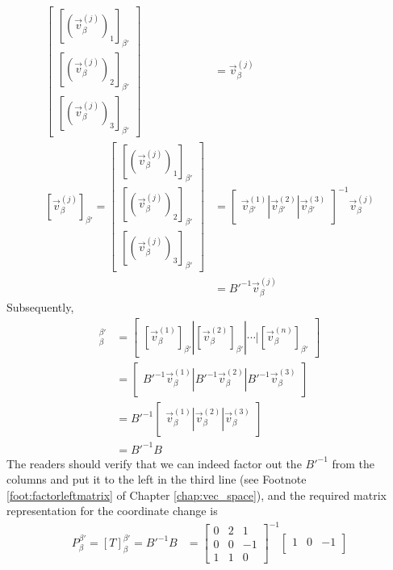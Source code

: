 \begin{solution}
\begin{align*}
\begin{bmatrix}
[(\vec{v}_{\beta}^{(j)})_1]_{\beta'} \\
[(\vec{v}_{\beta}^{(j)})_2]_{\beta'} \\
[(\vec{v}_{\beta}^{(j)})_3]_{\beta'}
\end{bmatrix}
&=
\vec{v}_{\beta}^{(j)} \\
[\vec{v}_{\beta}^{(j)}]_{\beta'} =
\begin{bmatrix}
[(\vec{v}_{\beta}^{(j)})_1]_{\beta'} \\
[(\vec{v}_{\beta}^{(j)})_2]_{\beta'} \\
[(\vec{v}_{\beta}^{(j)})_3]_{\beta'}
\end{bmatrix}
&=
\begin{bmatrix}
\vec{v}_{\beta'}^{(1)} | \vec{v}_{\beta'}^{(2)} | \vec{v}_{\beta'}^{(3)}
\end{bmatrix}^{-1}
\vec{v}_{\beta}^{(j)} \\
&= B'^{-1}\vec{v}_{\beta}^{(j)}
\end{align*} 
Subsequently,
\begin{align*}
[T]_\beta^{\beta'} &= \begin{bmatrix}
[\vec{v}_{\beta}^{(1)}]_{\beta'} | [\vec{v}_{\beta}^{(2)}]_{\beta'} | \cdots | [\vec{v}_{\beta}^{(n)}]_{\beta'}
\end{bmatrix} \\
&= \begin{bmatrix}
B'^{-1}\vec{v}_{\beta}^{(1)} | B'^{-1}\vec{v}_{\beta}^{(2)} | B'^{-1}\vec{v}_{\beta}^{(3)}
\end{bmatrix} \\
&= B'^{-1}\begin{bmatrix}
\vec{v}_{\beta}^{(1)} | \vec{v}_{\beta}^{(2)} | \vec{v}_{\beta}^{(3)}
\end{bmatrix} \\
&= B'^{-1}B
\end{align*}
The readers should verify that we can indeed factor out the $B'^{-1}$ from the columns and put it to the left in the third line (see Footnote \ref{foot:factorleftmatrix} of Chapter \ref{chap:vec_space}), and the required matrix representation for the coordinate change is
\begin{align*}
P_\beta^{\beta'} = [T]_\beta^{\beta'} = B'^{-1}B &= 
\begin{bmatrix}
0 & 2 & 1 \\
0 & 0 & -1 \\
1 & 1 & 0
\end{bmatrix}^{-1}
\begin{bmatrix}
1 & 0 & -1\\

\end{bmatrix}
\end{align*}
\end{solution}
